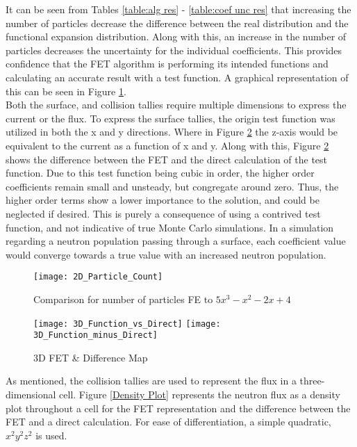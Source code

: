 \documentclass[10tma4paper]{article}
\begin{document}
It can be seen from Tables \ref{table:alg res} - \ref{table:coef unc res} that increasing the number of particles decrease the difference between the real distribution and the functional expansion distribution. Along with this, an increase in the number of particles decreases the uncertainty for the individual coefficients. This provides confidence that the FET algorithm is performing its intended functions and calculating an accurate result with a test function. A graphical representation of this can be seen in Figure \ref{2D Plot}. 
\\
Both the surface, and collision tallies require multiple dimensions to express the current or the flux. To express the surface tallies, the origin test function was utilized in both the x and y directions. Where in Figure \ref{3D Plot} the z-axis would be equivalent to the current as a function of x and y. Along with this, Figure \ref{3D Plot} shows the difference between the FET and the direct calculation of the test function. Due to this test function being cubic in order, the higher order coefficients remain small and unsteady, but congregate around zero. Thus, the higher order terms show a lower importance to the solution, and could be neglected if desired. This is purely a consequence of using a contrived test function, and not indicative of true Monte Carlo simulations. In a simulation regarding a neutron population passing through a surface, each coefficient value would converge towards a true value with an increased neutron population.
\\
\begin{figure}[!htbp]
	\caption{Comparison for number of particles FE to $5x^{3}-x^{2}-2x+4$}
	\begin{center}
	\texttt{[image: 2D\_Particle\_Count]}
	\label{2D Plot}
	\end{center}
\end{figure}
\begin{figure}[!htbp]
	\caption{3D FET \& Difference Map}
	\begin{center}
		\texttt{[image: 3D\_Function\_vs\_Direct]}
		\texttt{[image: 3D\_Function\_minus\_Direct]}
	\end{center}
	\label{3D Plot}
\end{figure}
As mentioned, the collision tallies are used to represent the flux in a three-dimensional cell. Figure \ref{Density Plot} represents the neutron flux as a density plot throughout a cell for the FET representation and the difference between the FET and a direct calculation. For ease of differentiation, a simple quadratic, $x^{2}y^{2}z^{2}$ is used.
\end{document}
